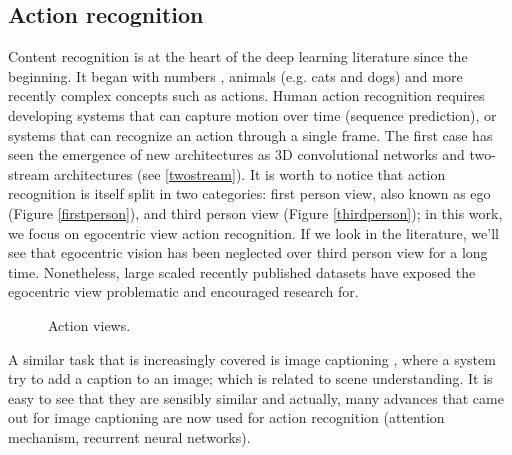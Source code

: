 \documentclass[12pt, a4paper]{report}
\begin{document}
			\subsection*{Action recognition}
				Content recognition is at the heart of the deep learning literature since the beginning. It began with numbers \cite{fukushima1981neocognitron,lecun1998gradient}, animals (e.g. cats and dogs) and more recently complex concepts such as actions.
				Human action recognition requires developing systems that can capture motion over time (sequence prediction), or systems that can recognize an action through a single frame.
				The first case has seen the emergence of new architectures as 3D convolutional networks \cite{ji20123d} and two-stream architectures \cite{sudhakaran2019lsta,wang2016temporal,ye2019two} (see \ref{twostream}).
				It is worth to notice that action recognition is itself split in two categories: first person view, also known as \gls{ego} (Figure \ref{firstperson}), and third person view (Figure \ref{thirdperson}); in this work, we focus on egocentric view action recognition.
				If we look in the literature, we'll see that egocentric vision has been neglected over third person view for a long time.
				Nonetheless, large scaled recently published datasets have exposed the egocentric view problematic and encouraged research for.
				\begin{figure}[h!]
					\centering
					\hfill
					\caption{Action views.}
				\end{figure}
				A similar task that is increasingly covered is image captioning \cite{xu2015show}, where a system try to add a caption to an image; which is related to scene understanding.
				It is easy to see that they are sensibly similar and actually, many advances that came out for image captioning are now used for action recognition (attention mechanism, recurrent neural networks).
\end{document}
